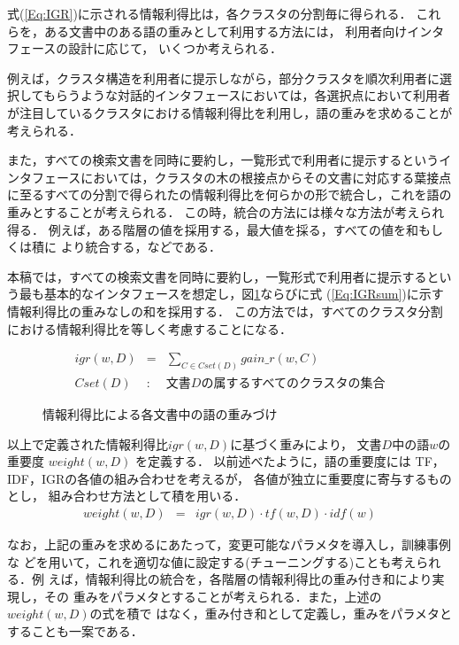 式(\ref{Eq:IGR})に示される情報利得比は，各クラスタの分割毎に得られる．
これらを，ある文書中のある語の重みとして利用する方法には，
利用者向けインタフェースの設計に応じて，
いくつか考えられる．

例えば，クラスタ構造を利用者に提示しながら，部分クラスタを順次利用者に選
択してもらうような対話的インタフェースにおいては，各選択点において利用者
が注目しているクラスタにおける情報利得比を利用し，語の重みを求めることが
考えられる．

また，すべての検索文書を同時に要約し，一覧形式で利用者に提示するというイ
ンタフェースにおいては，クラスタの木の根接点からその文書に対応する葉接点
に至るすべての分割で得られたの情報利得比を何らかの形で統合し，これを語の
重みとすることが考えられる．
この時，統合の方法には様々な方法が考えられ得る．
例えば，ある階層の値を採用する，最大値を採る，すべての値を和もしくは積に
より統合する，などである．

本稿では，すべての検索文書を同時に要約し，一覧形式で利用者に提示するとい
う最も基本的なインタフェースを想定し，図\ref{Fig:IGRSum}ならびに式
(\ref{Eq:IGRsum})に示す情報利得比の重みなしの和を採用する．
この方法では，すべてのクラスタ分割における情報利得比を等しく考慮することになる．

\begin{eqnarray}
  igr(w,D) & = & \sum_{C \in Cset(D)} gain\_r(w,C) \label{Eq:IGRsum}\\
  Cset(D)  & : & \mbox{文書$D$の属するすべてのクラスタの集合} \nonumber
\end{eqnarray}
\begin{figure}[htbp]
\begin{center}
\end{center}
\caption{情報利得比による各文書中の語の重みづけ}
\label{Fig:IGRSum}
\end{figure}

以上で定義された情報利得比$igr(w,D)$に基づく重みにより，
文書$D$中の語$w$の重要度 $weight(w,D)$ を定義する．
以前述べたように，語の重要度には TF，IDF，IGRの各値の組み合わせを考えるが，
各値が独立に重要度に寄与するものとし，
組み合わせ方法として積を用いる．
\begin{eqnarray}
  weight(w,D) & = & igr(w,D)\cdot tf(w,D)\cdot idf(w)
\end{eqnarray}

なお，上記の重みを求めるにあたって，変更可能なパラメタを導入し，訓練事例な
どを用いて，これを適切な値に設定する(チューニングする)ことも考えられる．例
えば，情報利得比の統合を，各階層の情報利得比の重み付き和により実現し，その
重みをパラメタとすることが考えられる．また，上述の$weight(w,D)$の式を積で
はなく，重み付き和として定義し，重みをパラメタとすることも一案である．


